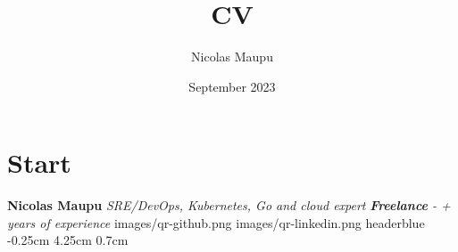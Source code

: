 \documentclass[darkhipster]{hipstercv}
\title{CV}
\author{Nicolas Maupu}
\date{September 2023}
\begin{document}
\section*{Start}

%
%

%
%
\FPsub\result{\thedatetwo}{\thedateone}
\FPsub\result{\thedatetwo}{\thedateone}
\FPdiv{}
\myage

\header
  {\color{headerbluefont} \huge \bfseries Nicolas Maupu}
  {\color{headerbluefont} \emph{\large SRE/DevOps, Kubernetes, Go and cloud expert}}
  {\color{headerbluefont} \emph{{\bfseries Freelance} - \FPround{}\myage+ years of experience}}
  {images/qr-github.png}
  {images/qr-linkedin.png}
  {headerblue}
  {-0.25cm} %
  {4.25cm} %
  {0.7cm} %



\subsection*{}
\end{document}
